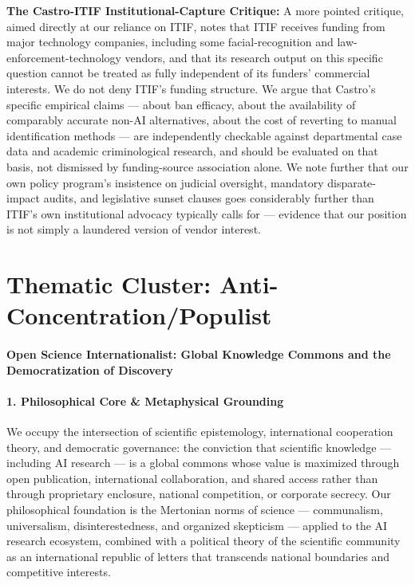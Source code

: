 \textbf{The Castro-ITIF Institutional-Capture Critique:} A more pointed
critique, aimed directly at our reliance on ITIF, notes that ITIF
receives funding from major technology companies, including some
facial-recognition and law-enforcement-technology vendors, and that its
research output on this specific question cannot be treated as fully
independent of its funders' commercial interests. We do not deny ITIF's
funding structure. We argue that Castro's specific empirical claims ---
about ban efficacy, about the availability of comparably accurate non-AI
alternatives, about the cost of reverting to manual identification
methods --- are independently checkable against departmental case data
and academic criminological research, and should be evaluated on that
basis, not dismissed by funding-source association alone. We note
further that our own policy program's insistence on judicial oversight,
mandatory disparate-impact audits, and legislative sunset clauses goes
considerably further than ITIF's own institutional advocacy typically
calls for --- evidence that our position is not simply a laundered
version of vendor interest.

\section{Thematic Cluster:
Anti-Concentration/Populist}\label{thematic-cluster-anti-concentrationpopulist}

\paragraph{Open Science Internationalist: Global Knowledge Commons and
the Democratization of
Discovery}\label{open-science-internationalist-global-knowledge-commons-and-the-democratization-of-discovery}

\paragraph{1. Philosophical Core \& Metaphysical
Grounding}\label{philosophical-core-metaphysical-grounding-27}

We occupy the intersection of scientific epistemology, international
cooperation theory, and democratic governance: the conviction that
scientific knowledge --- including AI research --- is a global commons
whose value is maximized through open publication, international
collaboration, and shared access rather than through proprietary
enclosure, national competition, or corporate secrecy. Our philosophical
foundation is the Mertonian norms of science --- communalism,
universalism, disinterestedness, and organized skepticism --- applied to
the AI research ecosystem, combined with a political theory of the
scientific community as an international republic of letters that
transcends national boundaries and competitive interests.

